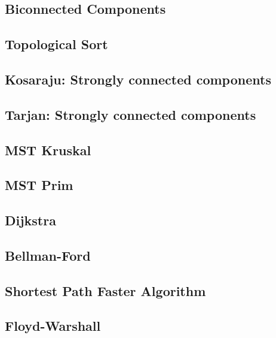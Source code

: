 \subsection{Biconnected Components}
\raggedbottom
\hrulefill
\subsection{Topological Sort}
\raggedbottom
\hrulefill
\subsection{Kosaraju: Strongly connected components}
\raggedbottom
\hrulefill
\subsection{Tarjan: Strongly connected components}
\raggedbottom
\hrulefill
\subsection{MST Kruskal}
\raggedbottom
\hrulefill
\subsection{MST Prim}
\raggedbottom
\hrulefill
\subsection{Dijkstra}
\raggedbottom
\hrulefill
\subsection{Bellman-Ford}
\raggedbottom
\hrulefill
\subsection{Shortest Path Faster Algorithm}
\raggedbottom
\hrulefill
\subsection{Floyd-Warshall}
\raggedbottom
\hrulefill
